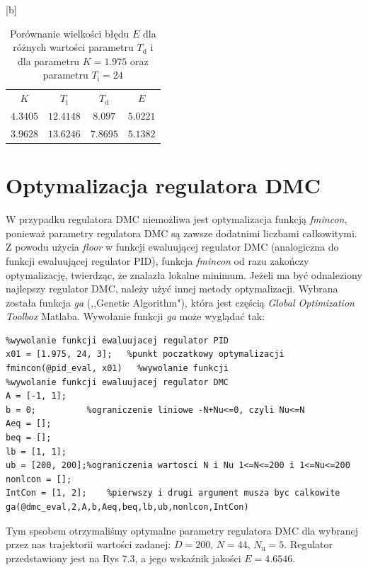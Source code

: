 \begin{table}

	[b] \caption{Porównanie wielkości błędu $E$ dla różnych wartości parametru $T_{\mathrm{d}}$ i dla parametru $K=1.975$ oraz parametru $T_{\mathrm{i}}=24$}

	\label{t_T_i}
	\centering
	\begin{small}
		\begin{tabular}{|c|c|c|c|}
			\hline
			$K$					&	$T_{\mathrm{i}}$	&	$T_{\mathrm{d}}$	&	$E$				\\
			$\num{4.3405}$		&	$\num{12.4148}$	&	$\num{8.097}$		&	$\num{5.0221}$	\\
			$\num{3.9628}$		&	$\num{13.6246}$	&	$\num{7.8695}$		&	$\num{5.1382}$	\\
			\hline
			\end{tabular}
	\end{small}
\end{table}

\section{Optymalizacja regulatora DMC}


W przypadku regulatora DMC niemożliwa jest optymalizacja funkcją \emph{fmincon}, ponieważ parametry regulatora DMC są zawsze dodatnimi liczbami całkowitymi. Z powodu użycia \emph{floor} w funkcji ewaluującej regulator DMC (analogiczna do funkcji ewaluującej regulator PID), funkcja \emph{fmincon} od razu zakończy optymalizację, twierdząc, że znalazła lokalne minimum. Jeżeli ma być odnaleziony najlepszy regulator DMC, należy użyć innej metody optymalizacji. Wybrana została funkcja \emph{ga} (,,Genetic Algorithm"), która jest częścią \emph{Global Optimization Toolbox} Matlaba. Wywołanie funkcji \emph{ga} może wyglądać tak:

\begin{lstlisting}
%wywolanie funkcji ewaluujacej regulator PID
x01 = [1.975, 24, 3];   %punkt poczatkowy optymalizacji
fmincon(@pid_eval, x01)   %wywolanie funkcji
%wywolanie funkcji ewaluujacej regulator DMC
A = [-1, 1];      
b = 0;          %ograniczenie liniowe -N+Nu<=0, czyli Nu<=N
Aeq = [];
beq = [];
lb = [1, 1];
ub = [200, 200];%ograniczenia wartosci N i Nu 1<=N<=200 i 1<=Nu<=200
nonlcon = [];
IntCon = [1, 2];    %pierwszy i drugi argument musza byc calkowite
ga(@dmc_eval,2,A,b,Aeq,beq,lb,ub,nonlcon,IntCon)
\end{lstlisting}

Tym spsobem otrzymaliśmy optymalne parametry regulatora DMC dla wybranej przez nas trajektorii wartości zadanej: $D=200$, $N=44$, $N_{\mathrm{u}}=5$. Regulator przedstawiony jest na Rys 7.3, a jego wskaźnik jakości $E=\num{4.6546}$. 


